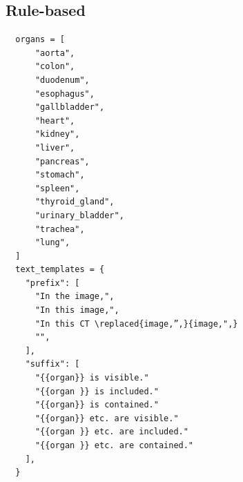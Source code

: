 \documentclass[bioengineering,article,submit,pdftex,moreauthors]{Definitions/mdpi}
\begin{document}
\subsection{Rule-based}
\begin{verbatim}
  organs = [
      "aorta",
      "colon",
      "duodenum",
      "esophagus",
      "gallbladder",
      "heart",
      "kidney",
      "liver",
      "pancreas",
      "stomach",
      "spleen",
      "thyroid_gland",
      "urinary_bladder",
      "trachea",
      "lung",
  ]
  text_templates = {
    "prefix": [
      "In the image,",
      "In this image,",
      "In this CT \replaced{image,”,}{image,",}
      "",
    ],
    "suffix": [
      "{{organ}} is visible."
      "{{organ }} is included."
      "{{organ}} is contained."
      "{{organ}} etc. are visible."
      "{{organ }} etc. are included."
      "{{organ }} etc. are contained."
    ],
  }
\end{verbatim}
\end{document}
